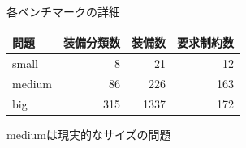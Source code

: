 \documentclass[dvipdfmx, 11pt]{beamer}
\begin{document}
\begin{frame}{各ベンチマークの詳細}
	\begin{center}
		\begin{tabular}{ l|r r r }
		問題		& 装備分類数	& 装備数		& 要求制約数 	\\ \hline
		small	& 8			& 21		& 12		\\
		medium	& 86		& 226		& 163		\\
		big		& 315		& 1337		& 172		\\
		\end{tabular}
	\end{center}
	\begin{center}
		mediumは現実的なサイズの問題
	\end{center}
\end{frame}
\end{document}
